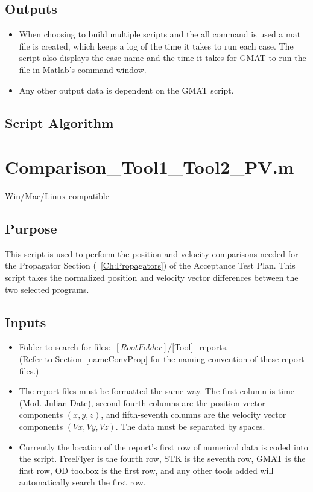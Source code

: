 \subsection{Outputs}
\begin{itemize}
    \item When choosing to build multiple scripts and the all command is
    used a mat file is created, which keeps a log of the time it takes
    to run each case. The script also displays the case name and the
    time it takes for GMAT to run the file in Matlab's command window.
    \item Any other output data is dependent on the GMAT script.
\end{itemize}
\subsection{Script Algorithm}

\section{Comparison\_Tool1\_Tool2\_PV.m}
Win/Mac/Linux compatible
\subsection{Purpose}
This script is used to perform the position and velocity comparisons
needed for the Propagator Section (~\ref{Ch:Propagators}) of the
Acceptance Test Plan. This script takes the normalized position and
velocity vector differences between the two selected programs.

\subsection{Inputs}
\begin{itemize}
    \item Folder to search for files$:$ $[Root Folder]/[$Tool$]$\_reports. \\
    (Refer to Section~\ref{nameConvProp} for the naming convention
    of these report files.)
    \item The report files must be formatted the same way. The first
    column is time (Mod. Julian Date), second-fourth columns are the position vector
    components $(x,y,z)$, and fifth-seventh columns are the velocity
    vector components $(Vx,Vy,Vz)$. The data must be separated by
    spaces.
    \item Currently the location of the report's first row of numerical data is coded into the script.
    FreeFlyer is the fourth row, STK is the seventh row, GMAT is the
    first row, OD toolbox is the first row, and any other tools added
    will automatically search the first row.
\end{itemize}
